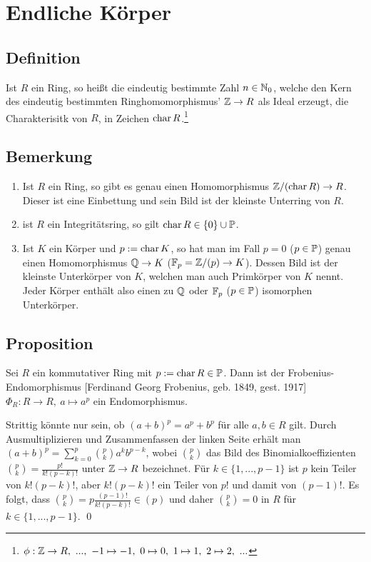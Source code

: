 \section{Endliche Körper}

\subsection{Definition} Ist $R$ ein Ring, so heißt die eindeutig bestimmte Zahl $n \in \N_0$, welche den Kern des eindeutig bestimmten Ringhomomorphismus' $\Z \to R$ als Ideal erzeugt, die Charakterisitk von $R$, in Zeichen $\chara R$.\footnote{$\phi: \Z \to R,~...,~-1 \mapsto -1,~0 \mapsto 0,~1 \mapsto 1,~2 \mapsto 2,~...$}

\subsection{Bemerkung}
\begin{enumerate}[label=(\alph*)]
	\item
		Ist $R$ ein Ring, so gibt es genau einen Homomorphismus $\Z/(\chara R) \to R$. Dieser ist eine Einbettung und sein Bild ist der kleinste Unterring von $R$.
	
	\item
		ist $R$ ein Integritätsring, so gilt $\chara R \in \{0\} \cup \P$.
		
	\item
		Ist $K$ ein Körper und $p := \chara K$, so hat man im Fall $p=0$ ($p \in \P$) genau einen Homomorphismus $\Q \to K$ \ALref{\ref{fixed:2.3.7}} ($\F_p = \Z/(p) \to K$). Dessen Bild ist der kleinste Unterkörper von $K$, welchen man auch Primkörper von $K$ nennt. Jeder Körper enthält also einen zu $\Q$ oder $\F_p$ ($p \in \P$) isomorphen Unterkörper.
\end{enumerate}

\subsection{Proposition} Sei $R$ ein kommutativer Ring mit $p := \chara R \in \P$. Dann ist der Frobenius-Endomorphismus [Ferdinand Georg Frobenius, geb. 1849, gest. 1917] $\Phi_R : R \to R,~a \mapsto a^p$ ein Endomorphismus.

\proof Strittig könnte nur sein, ob $(a+b)^ p = a^p + b^p$ für alle $a,b \in R$ gilt. Durch Ausmultiplizieren und Zusammenfassen der linken Seite erhält man $(a+b)^p = \sum_{k=0}^p \binom{p}{k} a^k b^{p-k}$, wobei $\binom{p}{k}$ das Bild des Binomialkoeffizienten $\binom{p}{k} = \frac{p!}{k!(p-k)!}$ unter $\Z \to R$ bezeichnet. Für $k \in \{1,...,p-1\}$ ist $p$ kein Teiler von $k!(p-k)!$, aber $k!(p-k)!$ ein Teiler von $p!$ und damit von $(p-1)!$. Es folgt, dass $\binom{p}{k} = p \frac{(p-1)!}{k!(p-k)!} \in (p)$ und daher $\binom{p}{k} = 0$ in $R$ für $k \in \{1,...,p-1\}$. \qed


